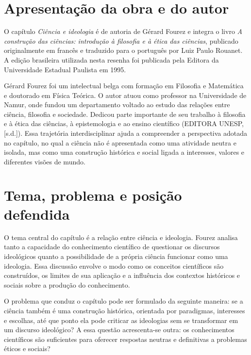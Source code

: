 \documentclass[12pt,a4paper]{article}
\newcommand{\tituloLivro}{A construção das ciências: introdução à filosofia e à ética das ciências}
\begin{document}
\vspace{0.7cm}

\onehalfspacing

\section*{Apresentação da obra e do autor}

O capítulo \textit{Ciência e ideologia} é de autoria de Gérard Fourez e
integra o livro \textit{\tituloLivro}, publicado originalmente em francês e
traduzido para o português por Luiz Paulo Rouanet. A edição brasileira
utilizada nesta resenha foi publicada pela Editora da Universidade Estadual
Paulista em 1995.

Gérard Fourez foi um intelectual belga com formação em Filosofia e
Matemática e doutorado em Física Teórica. O autor atuou como professor na
Universidade de Namur, onde fundou um departamento voltado ao estudo das
relações entre ciência, filosofia e sociedade. Dedicou parte importante de
seu trabalho à filosofia e à ética das ciências, à epistemologia e ao ensino
científico (EDITORA UNESP, [s.d.]). Essa trajetória interdisciplinar ajuda a
compreender a perspectiva adotada no capítulo, no qual a ciência não é
apresentada como uma atividade neutra e isolada, mas como uma construção
histórica e social ligada a interesses, valores e diferentes visões de mundo.

\section*{Tema, problema e posição defendida}

O tema central do capítulo é a relação entre ciência e ideologia. Fourez
analisa tanto a capacidade do conhecimento científico de questionar os
discursos ideológicos quanto a possibilidade de a própria ciência funcionar
como uma ideologia. Essa discussão envolve o modo como os conceitos
científicos são construídos, os limites de sua aplicação e a influência dos
contextos históricos e sociais sobre a produção do conhecimento.

O problema que conduz o capítulo pode ser formulado da seguinte maneira: se
a ciência também é uma construção histórica, orientada por paradigmas,
interesses e escolhas, até que ponto ela pode criticar as ideologias sem se
transformar em um discurso ideológico? A essa questão acrescenta-se outra:
os conhecimentos científicos são suficientes para oferecer respostas
neutras e definitivas a problemas éticos e sociais?
\end{document}
